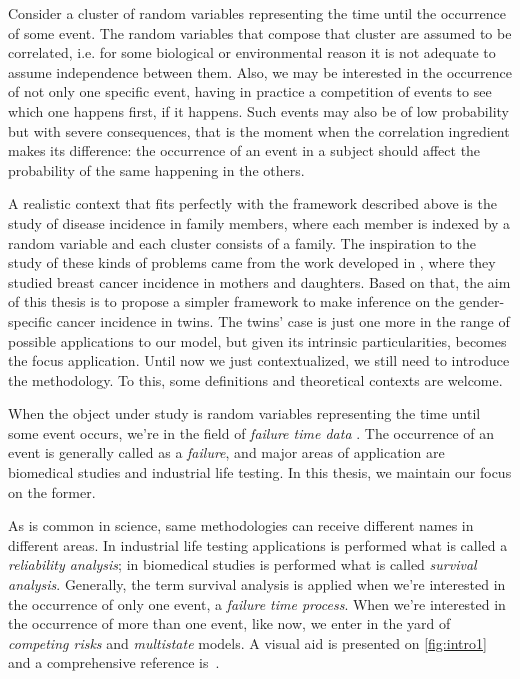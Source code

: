 Consider a cluster of random variables representing the time until the
occurrence of some event. The random variables that compose that cluster
are assumed to be correlated, i.e. for some biological or environmental
reason it is not adequate to assume independence between them. Also, we
may be interested in the occurrence of not only one specific event,
having in practice a competition of events to see which one happens
first, if it happens. Such events may also be of low probability but
with severe consequences, that is the moment when the correlation
ingredient makes its difference: the occurrence of an event in a subject
should affect the probability of the same happening in the others.

A realistic context that fits perfectly with the framework described
above is the study of disease incidence in family members, where each
member is indexed by a random variable and each cluster consists of a
family. The inspiration to the study of these kinds of problems came
from the work developed in , where they studied
breast cancer incidence in mothers and daughters. Based on that, the aim
of this thesis is to propose a simpler framework to make inference on
the gender-specific cancer incidence in twins. The twins' case is just
one more in the range of possible applications to our model, but given
its intrinsic particularities, becomes the focus application. Until now
we just contextualized, we still need to introduce the methodology. To
this, some definitions and theoretical contexts are welcome.

When the object under study is random variables representing the time
until some event occurs, we're in the field of \textit{failure time
  data} \cite{kalb&prentice}. The occurrence of an event is generally
called as a \textit{failure}, and major areas of application are
biomedical studies and industrial life testing. In this thesis, we
maintain our focus on the former.

As is common in science, same methodologies can receive different names
in different areas. In industrial life testing applications is performed
what is called a \textit{reliability analysis}; in biomedical studies is
performed what is called \textit{survival analysis}. Generally, the term
survival analysis is applied when we're interested in the occurrence of
only one event, a \textit{failure time process}. When we're interested
in the occurrence of more than one event, like now, we enter in the yard
of \textit{competing risks} and \textit{multistate} models. A visual aid
is presented on \autoref{fig:intro1} and a comprehensive reference
is~.

